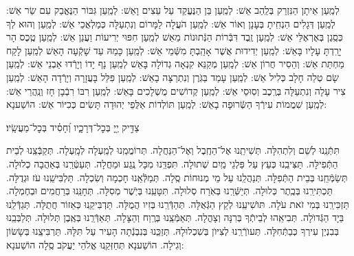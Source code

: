 \documentclass[twoside, openany, parskip=half, 11pt]{book}
\begin{document}
לְמַֽעַן אֵיתָן הַנִּזְרַק בְּלַֽהַב אֵשׁ: לְמַֽעַן בֵּן הַנֶּעֱקַד עַל עֵצִים וָאֵשׁ: לְמַֽעַן גִּבּוֹר הַנֶּאֱבַק עִם שַׂר אֵשׁ: לְמַֽעַן דְּגָלִים הִנְחִֽיתָ בְּעָנָן וְאוֹר אֵשׁ: לְמַֽעַן הֹעֲלָה לַמָּרוֹם וְנִתְעַלָּה כְּמַלְאֲכֵי אֵשׁ: לְמַֽעַן וְהוּא לְךָ כְּסֶֽגֶן בְּאֶרְאֶלֵּי אֵשׁ: לְמַֽעַן זֶֽבֶד דִּבְּֿרוֹת הַנְּֿתוּנוֹת מֵאֵשׁ לְמַֽעַן חִפּוּי יְרִיעוֹת וַעֲנַן אֵשׁ: לְמַֽעַן טֶֽכֶס הָר יָרַֽדְתָּ עָלָיו בָּאֵשׁ: לְמַֽעַן יְדִידוּת אֲשֶׁר אָהַֽבְתָּ מִשְּֿׁמֵי אֵשׁ: לְמַֽעַן כָּמַהּ עַד שָׁקְֿעָה הָאֵשׁ לְמַֽעַן לָקַח מַחְתַּת אֵשׁ: וְהֵסִיר חֲרוֹן אֵשׁ: לְמַֽעַן מְקַנֵּא קִנְאָה גְדוֹלָה בָּאֵשׁ לְמַֽעַן נָף יָדוֹ וְיָרְֿדוּ אַבְנֵי אֵשׁ: לְמַֽעַן שָׂם טְלֵה חָלָב כְּלִיל אֵשׁ: לְמַֽעַן עָמַד בַּגֹּֽרֶן וְנִתְרַצָּה בָאֵשׁ: לְמַֽעַן פִּלֵּל בָּעֲזָרָה וְיָרְֿדָה הָאֵשׁ: לְמַֽעַן צִיר עָלָה וְנִתְעַלָּה בְּרֶֽכֶב וְסֽוּסֵי אֵשׁ: לְמַֽעַן קְדוֹשִׁים מֻשְׁלָכִים בָּאֵשׁ: לְמַֽעַן רִבּוֹ רִבְֿבָן חָז וְנַֽהֲרֵי אֵשׁ:
לְמַֽעַן שִׁמֲמוֹת עִירְֿךָ הַשְּֿׂרוּפָה בָאֵשׁ:
 לְמַֽעַן תּוֹלְדוֹת אַלֻּפֵי יְהוּדָה תָּשִׂים כְּכִיּוֹר אֵשׁ: הוֹשַׁענָא:
 
 צַדִּ֣יק  יְ֖יָ בְּכׇל־דְּרָכָ֑יו וְ֝חָסִ֗יד בְּכׇל־מַעֲשָֽׂיו׃

תִּתְּֿנֵֽנוּ לְשֵׁם וְלִתְהִלָּה.
 תְּשִׁיתֵֽנוּ אֶל־הַחֶֽבֶל וְאֶל־הַנַּחֲלָה.
  תְּרוֹמֲמֵֽנוּ לְמַֽעְלָה לְמָֽעְלָה.
תְּקַבְּֿצֵֽנוּ לְבֵית הַתְּֿפִילָּה.
    תַּצִּיבֵֽנוּ כְּעֵץ עַל פַּלְגֵי מַֽיִם שְׁתוּלָה.
     תִּפְדֵּֽנוּ מִכָּל נֶֽגַע וּמַחֲלָה.
      תְּעַטְּֿרֵֽנוּ בְּאַהֲבָה כְלוּלָה.
       תְּשַׂמְּֿחֵֽנוּ בְּבֵית הַתְּֿפִלָּה.
        תְּנַהֲלֵֽנוּ עַל מֵי מְנוּחוֹת סֶֽלָה.
         תְּמַלְּֿאֵֽנוּ חָכְמָה וְשִׂכְלָה.
          תַּלְבִּישֵֽׁנוּ עֹז וּגְדֻלָּה.
           תַּכְתִּירֵֽנוּ בְּכֶֽתֶר כְּלוּלָה.
            תְּיַשְּֿׁרֵֽנוּ בְּאֹֽרַח סְלוּלָה.
             תִּטָּעֵֽנוּ בְּיֹֽשֶׁר מְסִלָּה.
              תְּחָנֵּֽנוּ בְּרַחֲמִים וּבְחֶמְלָה.
               תַּזְכִּירֵֽנוּ בְּמִי זֹאת עֹלָה.
תּוׂשִׁיעֵֽנוּ לְקֵץ הַגְּֿאֻלָּה.
                 תְּהַדְּֿרֵֽנוּ בְּזִיו הֲמֻלָּה.
תַּדְבִּיקֵֽנוּ כְּאֵזוֹר חֲתֻלָּה.
תְּגַדְּֿלֵֽנוּ בַּיָד הַגְּֿדוׂלָה.
 תְּבִיאֵֽהוּ לְבֵיתְֿךָ בְּרִנָּה וְצָהֳלָה.
                      תְּאַמְּֿצֵֽנוּ בְּרֶֽוַח וְהַצָּלָה.
תְּאַדְּֿרְֵנוּ בְּאֶֽבֶן תְּלוּלָה.
 תְּלַבְּבֵֽנוּ בְּבִנְיַן עִירְךָ כְּבַתְּֿחִלָּה.
תְּעוׂרְֿרֵֽנוּ לְצִיּוׂן בְּשִׁכְלוּלָהּ.
תְּזַכְֵּנוּ בְּנִבְנְֿתָה הָעִיר עַל תִּלָּהּ.
תַּרְבִּיצֵֽנוּ בְּשָׂשׂוֹן וְגִילָה.
                           הוֹשַׁענָא תְּחַזְּקֵֽנוּ אֱלֹהֵי יַעֲקֹב סֶֽלָה הוֹשַׁענָא:
\end{document}
